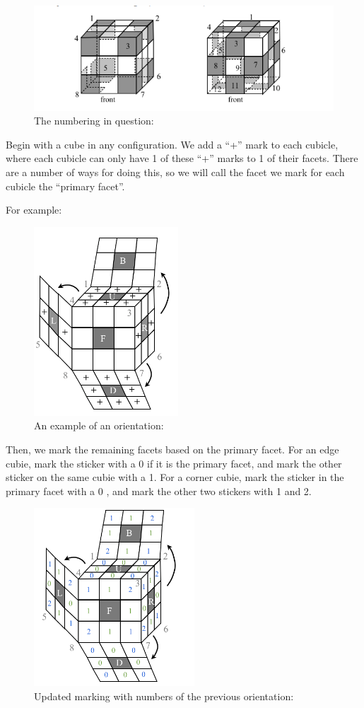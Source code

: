 \begin{figure}
\centering
\includegraphics{Screenshot from 2024-03-08 10-56-32.png}
\caption{The numbering in question:}
\end{figure}

Begin with a cube in any configuration. We add a ``+'' mark to each
cubicle, where each cubicle can only have 1 of these ``+'' marks to 1 of
their facets. There are a number of ways for doing this, so we will call
the facet we mark for each cubicle the ``primary facet''.

For example:

\begin{figure}
\centering
\includegraphics{Screenshot from 2024-03-08 11-03-50.png}
\caption{An example of an orientation:}
\end{figure}

Then, we mark the remaining facets based on the primary facet. For an
edge cubie, mark the sticker with a 0 if it is the primary facet, and
mark the other sticker on the same cubie with a 1. For a corner cubie,
mark the sticker in the primary facet with a 0 , and mark the other two
stickers with 1 and 2.

\begin{figure}
\centering
\includegraphics{Screenshot from 2024-03-08 11-07-22.png}
\caption{Updated marking with numbers of the previous orientation:}
\end{figure}

